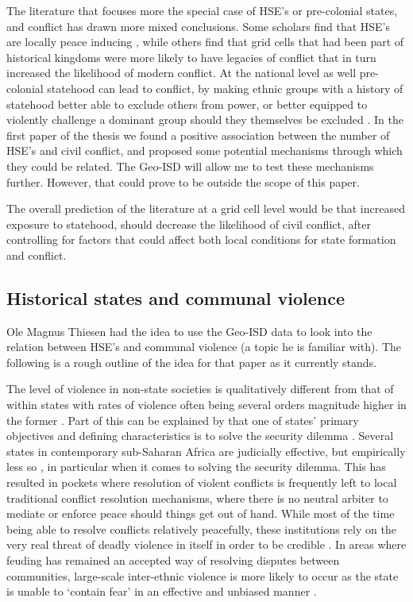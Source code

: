 \documentclass[12pt]{article}
\begin{document}
The literature that focuses more the special case of HSE's or pre-colonial
states, and conflict has drawn more mixed conclusions. Some scholars find that
HSE's are  locally peace inducing \citep{Wig2016, Depetris-Chauvin2016}, while
others find that grid cells that had been part of historical kingdoms were more
likely to have legacies of conflict that in turn increased the likelihood of
modern conflict. At the national level as well pre-colonial statehood can lead
to conflict, by making ethnic groups with a history of statehood better able to
exclude others from power, or better equipped to violently challenge a dominant
group should they themselves be excluded \citep{Paine2019}. In the first paper
of the thesis we found a positive association between the number of HSE's and
civil conflict, and proposed some potential mechanisms through which they could
be related. The Geo-ISD will allow me to test these mechanisms further. However,
that could prove to be outside the scope of this paper.

The overall prediction of the literature at a grid cell level would be that
increased exposure to statehood, should decrease the likelihood of civil
conflict, after controlling for factors that could affect both local conditions
for state formation and conflict.

\subsection{Historical states and communal violence}

Ole Magnus Thiesen had the idea to use the Geo-ISD data to look into the
relation between HSE's and communal violence (a topic he is familiar with). The
following is a rough outline of the idea for that paper as it currently stands.

The level of violence in non-state societies is qualitatively different from
that of within states with rates of violence often being several orders
magnitude higher in the former \citep{Pinker2012}. Part of this can be explained by
that one of states’ primary objectives and defining characteristics is to solve
the security dilemma \citep{Lake_1996}. Several states
in contemporary sub-Saharan Africa are judicially effective, but empirically
less so \citep{Jackson_1982}, in particular when it comes to solving the
security dilemma. This has resulted in pockets where resolution of violent
conflicts is frequently left to local traditional conflict resolution
mechanisms, where there is no neutral arbiter to mediate or enforce peace should
things get out of hand. While most of the time being able to resolve conflicts
relatively peacefully, these institutions rely on the very real threat of deadly
violence in itself in order to be credible \citep{Fearon_1996, Eaton_2007,
Eaton_2008}. In areas where feuding has remained an accepted way of resolving
disputes between communities, large-scale inter-ethnic violence is more likely
to occur \citep{Witsenburg2012} as the state is unable to ‘contain fear’ in
an effective and unbiased manner \citep{Lake_1996}.  
\end{document}
